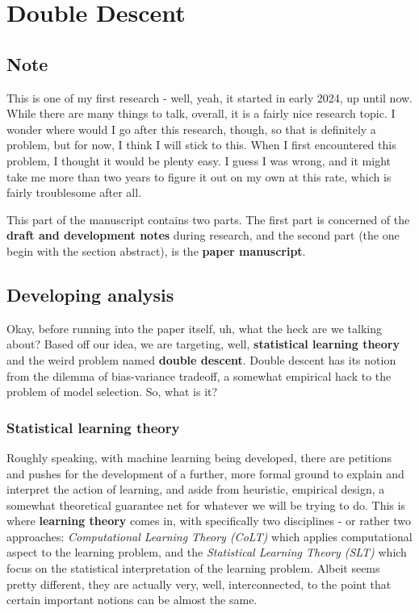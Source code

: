 \chapter[Double Descent]{Double Descent}
\section{Note}
This is one of my first research - well, yeah, it started in early 2024, up until now. While there are many things to talk, overall, it is a fairly nice research topic. I wonder where would I go after this research, though, so that is definitely a problem, but for now, I think I will stick to this. When I first encountered this problem, I thought it would be plenty easy. I guess I was wrong, and it might take me more than two years to figure it out on my own at this rate, which is fairly troublesome after all. 

This part of the manuscript contains two parts. The first part is concerned of the \textbf{draft and development notes} during research, and the second part (the one begin with the section abstract), is the \textbf{paper manuscript}. 

\section{Developing analysis}
Okay, before running into the paper itself, uh, what the heck are we talking about? Based off our idea, we are targeting, well, \textbf{statistical learning theory} and the weird problem named \textbf{double descent}. Double descent has its notion from the dilemma of bias-variance tradeoff, a somewhat empirical hack to the problem of model selection. So, what is it? 

\subsection{Statistical learning theory}
Roughly speaking, with machine learning being developed, there are petitions and pushes for the development of a further, more formal ground to explain and interpret the action of learning, and aside from heuristic, empirical design, a somewhat theoretical guarantee net for whatever we will be trying to do. This is where \textbf{learning theory} comes in, with specifically two disciplines - or rather two approaches: \textit{Computational Learning Theory (CoLT)} which applies computational aspect to the learning problem, and the \textit{Statistical Learning Theory (SLT)} which focus on the statistical interpretation of the learning problem. Albeit seems pretty different, they are actually very, well, interconnected, to the point that certain important notions can be almost the same. 


